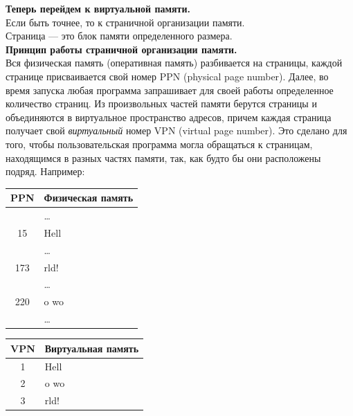 \documentclass[12pt, letterpaper]{article}
\begin{document}
\textbf{Теперь перейдем к виртуальной памяти.}\\
Если быть точнее, то к страничной организации памяти.\\
Страница — это блок памяти определенного размера.\\

\textbf{Принцип работы страничной организации памяти.}\\
Вся физическая память (оперативная память) разбивается на страницы, каждой странице присваивается свой номер PPN (physical page number). Далее, во время запуска любая программа запрашивает для своей работы определенное количество страниц. Из произвольных частей памяти берутся страницы и объединяются в виртуальное пространство адресов, причем каждая страница получает свой \textit{виртуальный} номер VPN (virtual page number). Это сделано для того, чтобы пользовательская программа могла обращаться к страницам, находящимся в разных частях памяти, так, как будто бы они расположены подряд. Например:\\

\begin{minipage}{.5\textwidth}
    \begin{tabular}{||c||m{4cm}||}
        \hline
        PPN & Физическая память\\
        \hline
        &\dots\\
        \hline
        15&\cellcolor{green!=40}Hell\\
        \hline
        &\dots\\
        \hline
        173&\cellcolor{green!=40}rld! \\
        \hline
        &\dots\\
        \hline
        220&\cellcolor{green!=40}o wo\\
        \hline
        &\dots\\
        \hline
    \end{tabular}
\end{minipage}
\begin{minipage}{.5\textwidth}
    \begin{tabular}{||c||m{4cm}||}
        \hline
        VPN & Виртуальная память\\
        \hline
        1&\cellcolor{green!=40}Hell\\
        \hline
        2&\cellcolor{green!=40}o wo\\
        \hline
        3&\cellcolor{green!=40}rld!\\
        \hline
    \end{tabular}
\end{minipage}
\end{document}
